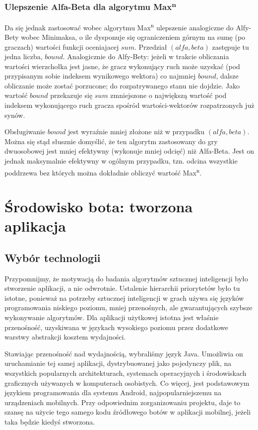 \documentclass{pracamgr}
\begin{document}
\subsection*{Ulepszenie Alfa-Beta dla algorytmu Max\textsuperscript{n}}

Da się jednak zastosować wobec algorytmu Max\textsuperscript{n} ulepszenie analogiczne do Alfy-Bety wobec Minimaksa\cite{korf}, o ile dysponuje się ograniczeniem górnym na sumę (po graczach) wartości funkcji oceniajacej \(sum\).
Przedział \((alfa, beta)\) zastępuje tu jedna liczba, \(bound\).
Analogicznie do Alfy-Bety: jeżeli w trakcie obliczania wartości wierzchołka jest jasne, że gracz wykonujący ruch może uzyskać (pod przypisanym sobie indeksem wynikowego wektora) co najmniej \(bound\), dalsze obliczanie może zostać porzucone; do rozpatrywanego stanu nie dojdzie.
Jako wartość \(bound\) przekazuje się \(sum\) zmniejszone o największą wartość pod indeksem wykonującego ruch gracza spośród wartości-wektorów rozpatrzonych już synów.

Obsługiwanie \(bound\) jest wyraźnie mniej złożone niż w przypadku \((alfa, beta)\).
Można się stąd słusznie domyślić, że ten algorytm zastosowany do gry dwuosobowej jest mniej efektywny (wykonuje mniej odcięć) niż Alfa-Beta.
Jest on jednak maksymalnie efektywny w ogólnym przypadku, tzn. odcina wszystkie poddrzewa bez których można dokładnie obliczyć wartość Max\textsuperscript{n}\cite{korf}.

\chapter{Środowisko bota: tworzona aplikacja}

\section{Wybór technologii}

Przypomnijmy, że motywacją do badania algorytmów sztucznej inteligencji było stworzenie aplikacji, a nie odwrotnie.
Ustalenie hierarchii priorytetów było tu istotne, ponieważ na potrzeby sztucznej inteligencji w grach używa się języków programowania niskiego poziomu, mniej przenośnych, ale gwarantujących szybsze wykonywanie algorytmów.
Dla aplikacji użytkowej istotna jest właśnie przenośność, uzyskiwana w językach wysokiego poziomu przez dodatkowe warstwy abstrakcji kosztem wydajności.

Stawiając przenośność nad wydajnością, wybraliśmy język Java.
Umożliwia on uruchamianie tej samej aplikacji, dystrybuowanej jako pojedynczy plik, na wszystkich popularnych architekturach, systemach operacyjnych i środowiskach graficznych używanych w komputerach osobistych.
Co więcej, jest podstawowym językiem programowania dla systemu Android, najpopularniejszemu na urządzeniach mobilnych.
Przy odpowiednim zorganizowaniu projektu, daje to szansę na użycie tego samego kodu źródłowego botów w aplikacji mobilnej, jeżeli taka będzie kiedyś stworzona.
\end{document}
